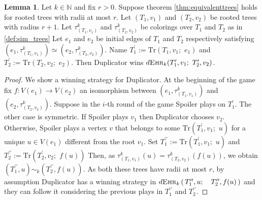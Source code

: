 \documentclass[12pt,notitlepage,a4paper]{article}
\theoremstyle{definition}
\newtheorem{lemma}{Lemma}[section]
\newcommand{\N}{\mathbb{N}}
\newcommand{\ehr}{\textsc{Ehr}}
\begin{document}
\begin{lemma} \label{lem:equivalentedges}
	Let $k\in \N$ and fix $r>0$. Suppose theorem \ref{thm:equivalenttrees}
	holds for rooted trees with radii at most $r$.
	Let $(T_1,v_1)$ and $(T_2,v_2)$ be rooted trees with radius
	$r+1$. Let $\tau^k_{(T_1,v_1)}$ and $\tau^k_{(T_2,v_2)}$
	be colorings over $T_1$ and $T_2$ as in \cref{def:sim_trees}
	Let $e_1$ and $e_2$ be initial edges 
	of $T_1$ and $T_2$ respectively satisfying 
	$(e_1,\tau^k_{(T_1,v_1)})\simeq (e_2,\tau^k_{(T_2,v_2)})$. Name 
	$T^\prime_1:=\mathrm{Tr}(T_1,v_1; \,\,e_1)$ and 
	$T^\prime_2:=\mathrm{Tr}(T_2,v_2;\,\,e_2)$. Then
	Duplicator wins 
	$d\ehr_{k}(T^\prime_1, v_1; \, \, T^\prime_2,v_2)$.
\end{lemma}
\begin{proof}
	We show a winning strategy for Duplicator.
	At the beginning of the game fix 
	$f:V(e_1)\rightarrow V(e_2)$ an isomorphism between 
	$(e_1,\tau^k_{(T_1,v_1)})$
	and $(e_2,\tau^k_{(T_2,v_2)})$.
	Suppose in the $i$-th round of the game Spoiler
	plays on $T^\prime_1$. The other case is symmetric.
	If Spoiler plays $v_1$ then Duplicator chooses $v_2$. 
	Otherwise, Spoiler plays a vertex $v$ that belongs
	to some $\mathrm{Tr}(T^\prime_1,v_1;\,\, u)$ for a unique $u\in V(e_1)$
	different from the root $v_1$. 
	Set $T^{\prime\prime}_1:=
	\mathrm{Tr}\left(T^\prime_1,v_1;\,\, u\right)$
	and
	$T^{\prime\prime}_2:=\mathrm{Tr}\left(T^\prime_2,v_2;\,\, f(u)\right)$
	Then, as $\tau^k_{(T_1,v_1)}\left(u\right)=\tau^k_{(T_2,v_2)}\left(f(u)\right)$,
	we obtain
	$\left(T^{\prime\prime}_1,u\right) \sim_k 
	\left(T^{\prime \prime}_2,f(u)\right)$.
	As both these trees have radii at most $r$, 
	by assumption Duplicator has a winning 
	strategy in
	$d\ehr_{k}\left(\,T^{\prime\prime}_1, u;
	\quad T^{\prime \prime}_2, f(u)\,  \right)$		
	and they can follow it considering the previous plays in
	$T^{\prime\prime}_1$ and $T^{\prime\prime}_2$.	
\end{proof}
\end{document}
